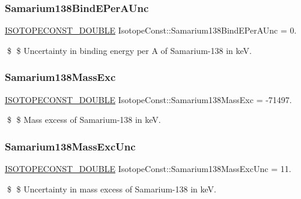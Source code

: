\subsubsection{\texorpdfstring{Samarium138\+Bind\+E\+Per\+A\+Unc}{Samarium138BindEPerAUnc}}
{\footnotesize\ttfamily \mbox{\hyperlink{group___isotope_const-_macros_ga8f45a7272ce02c0b4c65c44636ed719a}{I\+S\+O\+T\+O\+P\+E\+C\+O\+N\+S\+T\+\_\+\+D\+O\+U\+B\+LE}} Isotope\+Const\+::\+Samarium138\+Bind\+E\+Per\+A\+Unc = 0.}

\$ \$ Uncertainty in binding energy per A of Samarium-\/138 in keV. \mbox{\label{group___isotope_const-_samarium-_sm138_ga407bcc3334c550be50d13ddfa0026430}} 
\subsubsection{\texorpdfstring{Samarium138\+Mass\+Exc}{Samarium138MassExc}}
{\footnotesize\ttfamily \mbox{\hyperlink{group___isotope_const-_macros_ga8f45a7272ce02c0b4c65c44636ed719a}{I\+S\+O\+T\+O\+P\+E\+C\+O\+N\+S\+T\+\_\+\+D\+O\+U\+B\+LE}} Isotope\+Const\+::\+Samarium138\+Mass\+Exc = -\/71497.}

\$ \$ Mass excess of Samarium-\/138 in keV. \mbox{\label{group___isotope_const-_samarium-_sm138_gae1599d57e141d526582c35ba30cf98ee}} 
\subsubsection{\texorpdfstring{Samarium138\+Mass\+Exc\+Unc}{Samarium138MassExcUnc}}
{\footnotesize\ttfamily \mbox{\hyperlink{group___isotope_const-_macros_ga8f45a7272ce02c0b4c65c44636ed719a}{I\+S\+O\+T\+O\+P\+E\+C\+O\+N\+S\+T\+\_\+\+D\+O\+U\+B\+LE}} Isotope\+Const\+::\+Samarium138\+Mass\+Exc\+Unc = 11.}

\$ \$ Uncertainty in mass excess of Samarium-\/138 in keV. \mbox{\label{group___isotope_const-_samarium-_sm138_ga01a467299cd16bd79d2d97f20274ae52}} 
